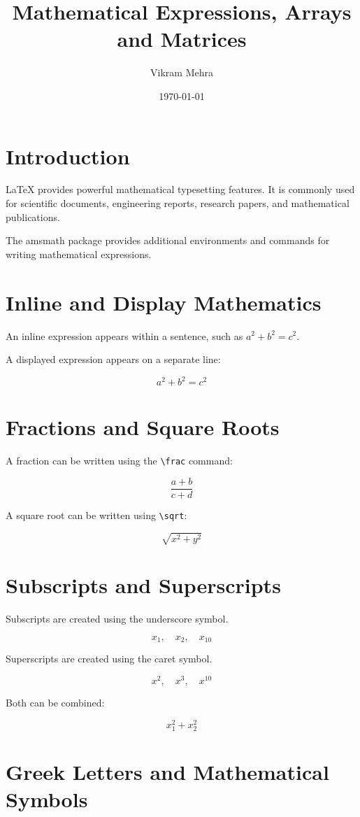 \documentclass[12pt,a4paper]{article}
\title{Mathematical Expressions, Arrays and Matrices}
\author{Vikram Mehra}
\date{\today}
\begin{document}
\maketitle

\section{Introduction}

LaTeX provides powerful mathematical typesetting features.
It is commonly used for scientific documents, engineering
reports, research papers, and mathematical publications.

The amsmath package provides additional environments
and commands for writing mathematical expressions.

\section{Inline and Display Mathematics}

An inline expression appears within a sentence, such as
$a^2+b^2=c^2$.

A displayed expression appears on a separate line:

\[
a^2+b^2=c^2
\]

\section{Fractions and Square Roots}

A fraction can be written using the \texttt{\textbackslash frac}
command:

\[
\frac{a+b}{c+d}
\]

A square root can be written using \texttt{\textbackslash sqrt}:

\[
\sqrt{x^2+y^2}
\]

\section{Subscripts and Superscripts}

Subscripts are created using the underscore symbol.

\[
x_1,\quad x_2,\quad x_{10}
\]

Superscripts are created using the caret symbol.

\[
x^2,\quad x^3,\quad x^{10}
\]

Both can be combined:

\[
x_1^2+x_2^2
\]

\section{Greek Letters and Mathematical Symbols}
\end{document}
